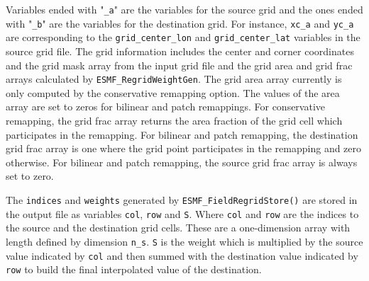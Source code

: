 Variables ended with "{\tt \_a}" are the variables for the source grid and the ones ended with "{\tt \_b}"
are the variables for the destination grid. For instance, {\tt xc\_a} and {\tt yc\_a} are corresponding
to the {\tt grid\_center\_lon} and {\tt grid\_center\_lat} variables in the source grid file.
The grid information includes the center and corner coordinates and the grid mask 
array from the input grid file and
the grid area and grid frac arrays calculated by {\tt ESMF\_RegridWeightGen}. 
The grid area array currently is only
computed by the conservative remapping option. The values of the area
array are set to zeros for bilinear
and patch remappings.
For conservative remapping, the grid frac array 
returns the area fraction of the grid cell which participates in the remapping. 
For bilinear and patch remapping, the
destination grid frac array is one where the grid point participates in the remapping
and zero otherwise. For bilinear and patch remapping, the source grid frac array
is always set to zero.

The {\tt indices} and {\tt weights} generated by {\tt ESMF\_FieldRegridStore()} are stored in the output
file as variables {\tt col}, {\tt row} and {\tt S}. Where {\tt col} and {\tt row} are the indices to the
source and the destination grid cells.  These are a one-dimension array with length defined by dimension 
{\tt n\_s}. {\tt S} is the weight which is multiplied by the source value indicated by {\tt col} and then
summed with the destination value indicated by {\tt row} to build the final interpolated value of the 
destination. 

